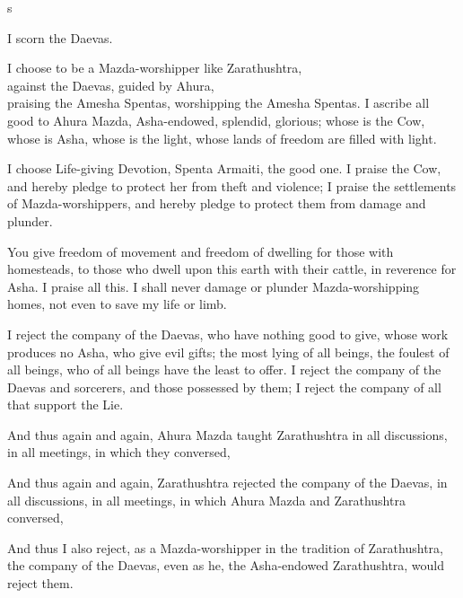 \documentclass{book}
\begin{document}
\beforeeledchapter

\begin{pages}

\begin{Leftside}
\beginnumbering

s
\pend

\pstart
\centerline{I scorn the Daevas.}
\pend

\numberpstarttrue
\autopar

I choose to be a Mazda-worshipper like Zarathushtra,\\
against the Daevas, guided by Ahura,\\
praising the Amesha Spentas, worshipping the Amesha Spentas. I ascribe all good to Ahura Mazda, Asha-endowed, splendid, glorious; whose is the Cow, whose is Asha, whose is the light, whose lands of freedom are filled with light.

I choose Life-giving Devotion, Spenta Armaiti, the good one. I praise the Cow, and hereby pledge to protect her from theft and violence; I praise the settlements of Mazda-worshippers, and hereby pledge to protect them from damage and plunder.

You give freedom of movement and freedom of dwelling for those with homesteads, to those who dwell upon this earth with their cattle, in reverence for Asha.  I praise all this. I shall never damage or plunder Mazda-worshipping homes, not even to save my life or limb.

I reject the company of the Daevas, who have nothing good to give, whose work produces no Asha, who give evil gifts; the most lying of all beings, the foulest of all beings, who of all beings have the least to offer.  I reject the company of the Daevas and sorcerers, and those possessed by them; I reject the company of all that support the Lie.

And thus again and again, Ahura Mazda taught Zarathushtra in all discussions, in all meetings, in which they conversed,

And thus again and again, Zarathushtra rejected the company of the Daevas, in all discussions, in all meetings, in which Ahura Mazda and Zarathushtra conversed,

And thus I also reject, as a Mazda-worshipper in the tradition of Zarathushtra, the company of the Daevas, even as he, the Asha-endowed Zarathushtra, would reject them.


\end{Leftside}
\end{pages}
\end{document}
